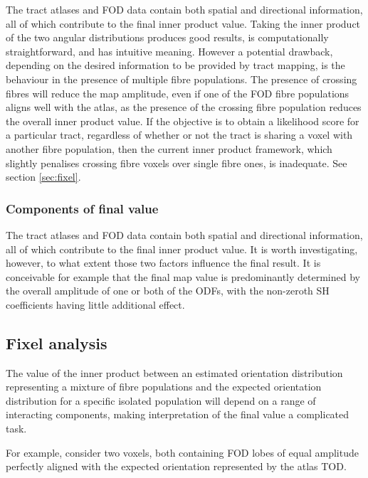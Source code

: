 The tract atlases and FOD data contain both spatial and directional information, all of which contribute to the final inner product value.
Taking the inner product of the two angular distributions produces good results, is computationally straightforward, and has intuitive meaning.
However a potential drawback, depending on the desired information to be provided by tract mapping, is the behaviour in the presence of multiple fibre populations.
The presence of crossing fibres will reduce the map amplitude, even if one of the FOD fibre populations aligns well with the atlas, as the presence of the crossing fibre population reduces the overall inner product value.
If the objective is to obtain a likelihood score for a particular tract, regardless of whether or not the tract is sharing a voxel with another fibre population, then the current inner product framework, which slightly penalises crossing fibre voxels over single fibre ones, is inadequate. 
See section \ref{sec:fixel}.

\subsubsection{Components of final value}

The tract atlases and FOD data contain both spatial and directional information, all of which contribute to the final inner product value.
It is worth investigating, however, to what extent those two factors influence the final result.
It is conceivable for example that the final map value is predominantly determined by the overall amplitude of one or both of the ODFs, with the non-zeroth SH coefficients having little additional effect.


\subsection{Fixel analysis}

The value of the inner product between an estimated orientation distribution representing a mixture of fibre populations and the expected orientation distribution for a specific isolated population will depend on a range of interacting components, making interpretation of the final value a complicated task.


For example, consider two voxels, both containing FOD lobes of equal amplitude perfectly aligned with the expected orientation represented by the atlas TOD.

